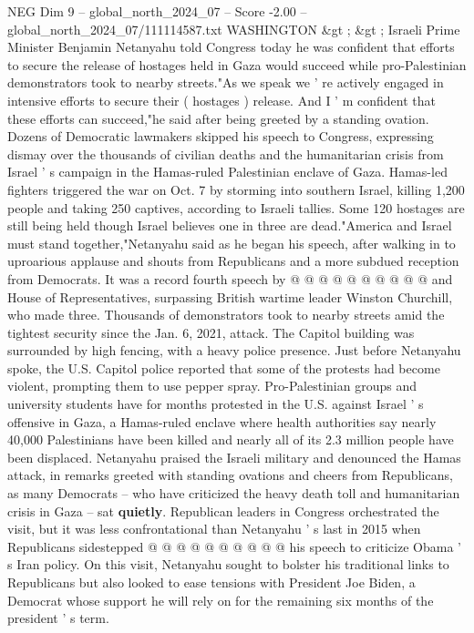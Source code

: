 \begin{textsample}{NEG Dim 9 – global\_north\_2024\_07 – Score -2.00 – global\_north\_2024\_07/111114587.txt}  \label{ex:f9_neg_145}
WASHINGTON \&gt ; \&gt ; Israeli Prime Minister Benjamin Netanyahu told Congress today he was confident that efforts to secure the release of hostages held in Gaza would succeed while pro-Palestinian demonstrators took to nearby streets."As we speak we ' re actively engaged in intensive efforts to secure their ( hostages ) release.
And I ' m confident that these efforts can succeed,"he said after being greeted by a standing ovation.
Dozens of Democratic lawmakers skipped his speech to Congress, expressing dismay over the thousands of civilian deaths and the humanitarian crisis from Israel ' s campaign in the Hamas-ruled Palestinian enclave of Gaza.
Hamas-led fighters triggered the war on Oct. 7 by storming into southern Israel, killing 1,200 people and taking 250 captives, according to Israeli tallies.
Some 120 hostages are still being held though Israel believes one in three are dead."America and Israel must stand together,"Netanyahu said as he began his speech, after walking in to uproarious applause and shouts from Republicans and a more subdued reception from Democrats.
It was a record fourth speech by @ @ @ @ @ @ @ @ @ @ and House of Representatives, surpassing British wartime leader Winston Churchill, who made three.
Thousands of demonstrators took to nearby streets amid the tightest security since the Jan. 6, 2021, attack.
The Capitol building was surrounded by high fencing, with a heavy police presence.
Just before Netanyahu spoke, the U.S.
Capitol police reported that some of the protests had become violent, prompting them to use pepper spray.
Pro-Palestinian groups and university students have for months protested in the U.S. against Israel ' s offensive in Gaza, a Hamas-ruled enclave where health authorities say nearly 40,000 Palestinians have been killed and nearly all of its 2.3 million people have been displaced.
Netanyahu praised the Israeli military and denounced the Hamas attack, in remarks greeted with standing ovations and cheers from Republicans, as many Democrats -- who have criticized the heavy death toll and humanitarian crisis in Gaza -- sat \textbf{quietly}.
Republican leaders in Congress orchestrated the visit, but it was less confrontational than Netanyahu ' s last in 2015 when Republicans sidestepped @ @ @ @ @ @ @ @ @ @ his speech to criticize Obama ' s Iran policy.
On this visit, Netanyahu sought to bolster his traditional links to Republicans but also looked to ease tensions with President Joe Biden, a Democrat whose support he will rely on for the remaining six months of the president ' s term.

\end{textsample}

